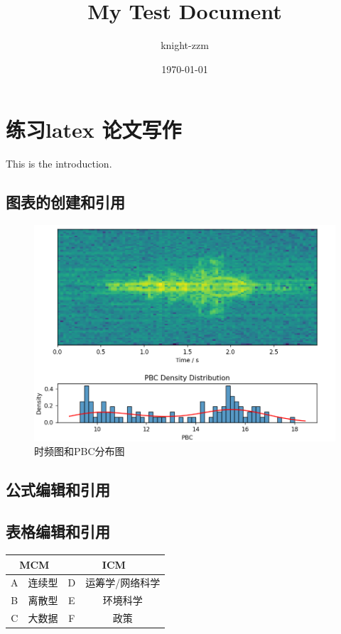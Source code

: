 \documentclass[a4paper,12pt]{article}
\begin{document}
\title{\huge My Test Document}
\author{{\large knight-zzm}}
\date{\today}
\maketitle
\thispagestyle{empty} %
\newpage

\tableofcontents
\thispagestyle{empty} %
\newpage
{}
\section{练习latex 论文写作}
This is the introduction.

\subsection{图表的创建和引用}
    
    \begin{figure}[h]
        \centering
        \includegraphics[width=1\textwidth]{时频图和PBC分布图.png}
        \caption{时频图和PBC分布图}
        \label{fig:time-freq}
    \end{figure}

\subsection{公式编辑和引用}

\subsection{表格编辑和引用}
    \begin{tabular}{|c|c|c|c|}
        \hline
        \multicolumn{2}{|c|}{MCM} & \multicolumn{2}{|c|}{ICM} \\
        \hline
        A & 连续型 & D & 运筹学/网络科学\\
        \hline
        B & 离散型 & E & 环境科学\\
        \hline
        C & 大数据 & F & 政策\\
        \hline
    \end{tabular}
    
\end{document}
